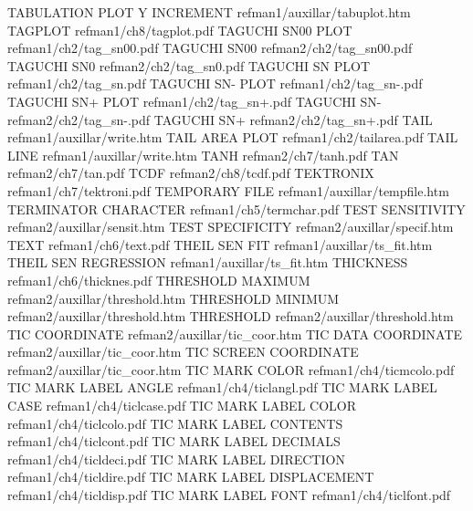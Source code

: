 TABULATION PLOT Y INCREMENT             refman1/auxillar/tabuplot.htm
TAGPLOT                                 refman1/ch8/tagplot.pdf
TAGUCHI SN00 PLOT                       refman1/ch2/tag_sn00.pdf
TAGUCHI SN00                            refman2/ch2/tag_sn00.pdf
TAGUCHI SN0                             refman2/ch2/tag_sn0.pdf
TAGUCHI SN PLOT                         refman1/ch2/tag_sn.pdf
TAGUCHI SN- PLOT                        refman1/ch2/tag_sn-.pdf
TAGUCHI SN+ PLOT                        refman1/ch2/tag_sn+.pdf
TAGUCHI SN-                             refman2/ch2/tag_sn-.pdf
TAGUCHI SN+                             refman2/ch2/tag_sn+.pdf
TAIL                                    refman1/auxillar/write.htm
TAIL AREA PLOT                          refman1/ch2/tailarea.pdf
TAIL LINE                               refman1/auxillar/write.htm
TANH                                    refman2/ch7/tanh.pdf
TAN                                     refman2/ch7/tan.pdf
TCDF                                    refman2/ch8/tcdf.pdf
TEKTRONIX                               refman1/ch7/tektroni.pdf
TEMPORARY FILE                          refman1/auxillar/tempfile.htm
TERMINATOR CHARACTER                    refman1/ch5/termchar.pdf
TEST SENSITIVITY                        refman2/auxillar/sensit.htm
TEST SPECIFICITY                        refman2/auxillar/specif.htm
TEXT                                    refman1/ch6/text.pdf
THEIL SEN FIT                           refman1/auxillar/ts_fit.htm
THEIL SEN REGRESSION                    refman1/auxillar/ts_fit.htm
THICKNESS                               refman1/ch6/thicknes.pdf
THRESHOLD MAXIMUM                       refman2/auxillar/threshold.htm
THRESHOLD MINIMUM                       refman2/auxillar/threshold.htm
THRESHOLD                               refman2/auxillar/threshold.htm
TIC COORDINATE                          refman2/auxillar/tic_coor.htm
TIC DATA COORDINATE                     refman2/auxillar/tic_coor.htm
TIC SCREEN COORDINATE                   refman2/auxillar/tic_coor.htm
TIC MARK COLOR                          refman1/ch4/ticmcolo.pdf
TIC MARK LABEL ANGLE                    refman1/ch4/ticlangl.pdf
TIC MARK LABEL CASE                     refman1/ch4/ticlcase.pdf
TIC MARK LABEL COLOR                    refman1/ch4/ticlcolo.pdf
TIC MARK LABEL CONTENTS                 refman1/ch4/ticlcont.pdf
TIC MARK LABEL DECIMALS                 refman1/ch4/ticldeci.pdf
TIC MARK LABEL DIRECTION                refman1/ch4/ticldire.pdf
TIC MARK LABEL DISPLACEMENT             refman1/ch4/ticldisp.pdf
TIC MARK LABEL FONT                     refman1/ch4/ticlfont.pdf
